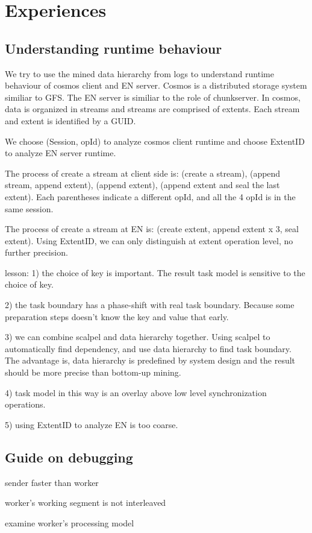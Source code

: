 
\section{Experiences}
\label{sec:exp}


\subsection{Understanding runtime behaviour}

We try to use the mined data hierarchy from logs to
understand runtime behaviour of cosmos client and EN server.
Cosmos is a distributed storage system similiar to GFS. The
EN server is similiar to the role of chunkserver. In cosmos,
data is organized in streams and streams are comprised of
extents. Each stream and extent is identified by a GUID.

We choose (Session, opId) to analyze cosmos client runtime
and choose ExtentID to analyze EN server runtime.

The process of create a stream at client side is: (create a
stream), (append stream, append extent), (append extent),
(append extent and seal the last extent). Each parentheses
indicate a different opId, and all the 4 opId is in the same
session.

The process of create a stream at EN is: (create extent,
append extent x 3, seal extent). Using ExtentID, we can only
distinguish at extent operation level, no further precision.

lesson:
1) the choice of key is important. The result task model is
sensitive to the choice of key.

2) the task boundary has a phase-shift with real task
boundary. Because some preparation steps doesn't know the
key and value that early.

3) we can combine scalpel and data hierarchy together. Using
scalpel to automatically find dependency, and use data
hierarchy to find task boundary. The advantage is, data
hierarchy is predefined by system design and the result
should be more precise than bottom-up mining.

4) task model in this way is an overlay above low level
synchronization operations.

5) using ExtentID to analyze EN is too coarse.

\subsection{Guide on debugging}

sender faster than worker

worker's working segment is not interleaved

examine worker's processing model
